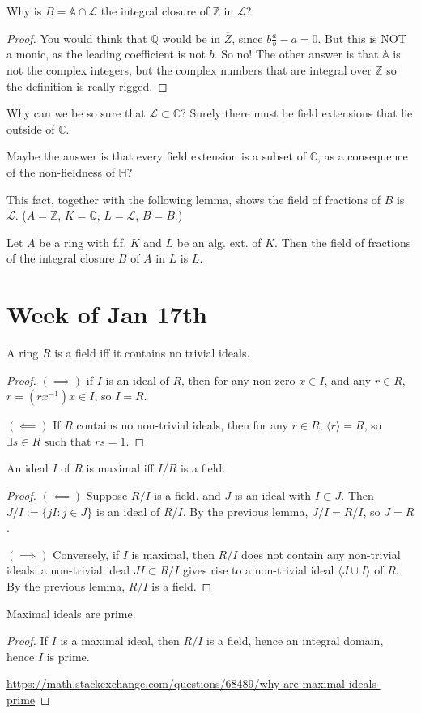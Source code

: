 \begin{question}
Why is $B=\mathbb{A}\cap \mathcal{L}$ the integral closure of $\mathbb{Z}$ in $\mathcal{L}$?
\end{question}
\begin{proof}
You would think that $\mathbb{Q}$ would be in $\overline{Z}$, since $b\frac{a}{b}-a=0$. But this is NOT a monic, as the leading coefficient is not $b$. So no! The other answer is that $\mathbb{A}$ is not the complex integers, but the complex numbers that are integral over $\mathbb{Z}$ so the definition is really rigged.
\end{proof}

\begin{question}
Why can we be so sure that $\mathcal{L}\subset \mathbb{C}$? Surely there must be field extensions that lie outside of $\mathbb{C}$.
\end{question}
Maybe the answer is that every field extension is a subset of $\mathbb{C}$, as a consequence of the non-fieldness of $\mathbb{H}$?

This fact, together with the following lemma, shows the field of fractions of $B$ is $\mathcal{L}$. ($A=\mathbb{Z}$, $K=\mathbb{Q}$, $L=\mathcal{L}$, $B=B$.)
\begin{lemma}
Let $A$ be a ring with f.f. $K$ and $L$ be an alg. ext. of $K$. Then the field of fractions of the integral closure $B$ of $A$ in $L$ is $L$.
\end{lemma}

\section{Week of Jan 17th}

\begin{lemma}
A ring $R$ is a field iff it contains no trivial ideals.
\end{lemma}
\begin{proof}
$(\implies)$ if $I$ is an ideal of $R$, then for any non-zero $x\in I$, and any $r\in R$, $r=(rx^{-1})x\in I$, so $I=R$.

$(\impliedby)$ If $R$ contains no non-trivial ideals, then for any $r\in R$, $\langle r\rangle =R$, so $\exists s\in R \text{ such that } rs=1$.
\end{proof}

\begin{lemma}
An ideal $I$ of $R$ is maximal iff $I/R$ is a field.
\end{lemma}
\begin{proof}
$(\impliedby)$ Suppose $R/I$ is a field, and $J$  is an ideal with $I\subset J$. Then $J/I:=\{jI: j\in J\}$ is an ideal of $R/I$. By the previous lemma, $J/I=R/I$, so $J=R$.

$(\implies)$ Conversely, if $I$ is maximal, then $R/I$ does not contain any non-trivial ideals: a non-trivial ideal $JI\subset R/I$ gives rise to a non-trivial ideal $\langle J\cup I\rangle$ of $R$. By the previous lemma, $R/I$ is a field.
\end{proof}

\begin{corollary}
Maximal ideals are prime.
\end{corollary}
\begin{proof}
If $I$ is a maximal ideal, then $R/I$ is a field, hence an integral domain, hence $I$ is prime.

\url{https://math.stackexchange.com/questions/68489/why-are-maximal-ideals-prime}
\end{proof}